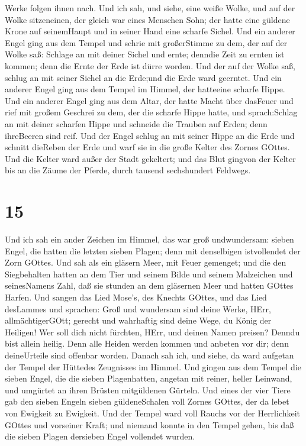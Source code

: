Werke folgen ihnen nach.  Und ich sah, und siehe, eine
weiße Wolke, und auf der Wolke sitzeneinen, der gleich war eines
Menschen Sohn; der hatte eine güldene Krone auf seinemHaupt und in
seiner Hand eine scharfe Sichel.  Und ein anderer Engel
ging aus dem Tempel und schrie mit großerStimme zu dem, der auf der
Wolke saß: Schlage an mit deiner Sichel und ernte; denndie Zeit zu
ernten ist kommen; denn die Ernte der Erde ist dürre worden.
 Und der auf der Wolke saß, schlug an mit seiner Sichel an
die Erde;und die Erde ward geerntet.  Und ein anderer Engel
ging aus dem Tempel im Himmel, der hatteeine scharfe Hippe.
 Und ein anderer Engel ging aus dem Altar, der hatte Macht
über dasFeuer und rief mit großem Geschrei zu dem, der die scharfe Hippe
hatte, und sprach:Schlag an mit deiner scharfen Hippe und schneide die
Trauben auf Erden; denn ihreBeeren sind reif.  Und der
Engel schlug an mit seiner Hippe an die Erde und schnitt dieReben der
Erde und warf sie in die große Kelter des Zornes GOttes. 
Und die Kelter ward außer der Stadt gekeltert; und das Blut gingvon der
Kelter bis an die Zäume der Pferde, durch tausend sechshundert Feldwegs.

\hypertarget{section-13}{%
\section{15}\label{section-13}}

 Und ich sah ein ander Zeichen im Himmel, das war groß
undwundersam: sieben Engel, die hatten die letzten sieben Plagen; denn
mit denselbigen istvollendet der Zorn GOttes.  Und sah als
ein gläsern Meer, mit Feuer gemenget; und die den Siegbehalten hatten an
dem Tier und seinem Bilde und seinem Malzeichen und seinesNamens Zahl,
daß sie stunden an dem gläsernen Meer und hatten GOttes Harfen.
 Und sangen das Lied Mose's, des Knechts GOttes, und das
Lied desLammes und sprachen: Groß und wundersam sind deine Werke, HErr,
allmächtigerGOtt; gerecht und wahrhaftig sind deine Wege, du König der
Heiligen!  Wer soll dich nicht fürchten, HErr, und deinen
Namen preisen? Denndu bist allein heilig. Denn alle Heiden werden kommen
und anbeten vor dir; denn deineUrteile sind offenbar worden.
 Danach sah ich, und siehe, da ward aufgetan der Tempel der
Hüttedes Zeugnisses im Himmel.  Und gingen aus dem Tempel
die sieben Engel, die die sieben Plagenhatten, angetan mit reiner,
heller Leinwand, und umgürtet an ihren Brüsten mitgüldenen Gürteln.
 Und eines der vier Tiere gab den sieben Engeln sieben
güldeneSchalen voll Zornes GOttes, der da lebet von Ewigkeit zu
Ewigkeit.  Und der Tempel ward voll Rauchs vor der
Herrlichkeit GOttes und vorseiner Kraft; und niemand konnte in den
Tempel gehen, bis daß die sieben Plagen dersieben Engel vollendet
wurden.

